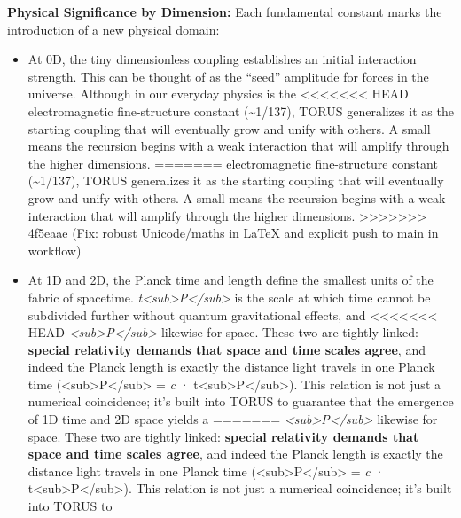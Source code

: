 \documentclass[]{article}
\begin{document}
{\textbf{Physical Significance by Dimension:} Each fundamental constant
marks the introduction of a new physical domain:

\begin{itemize}
\item
  At 0D, the tiny dimensionless coupling \alpha establishes an initial
  interaction strength. This can be thought of as the ``seed'' amplitude
  for forces in the universe. Although \alpha in our everyday physics is the
<<<<<<< HEAD
  electromagnetic fine-structure constant (\textasciitilde1/137), TORUS
  generalizes it as the starting coupling that will eventually grow and
  unify with others. A small \alpha means the recursion begins with a weak
  interaction that will amplify through the higher dimensions.
=======
  electromagnetic fine-structure constant (\textasciitilde{}1/137),
  TORUS generalizes it as the starting coupling that will eventually
  grow and unify with others. A small \alpha means the recursion begins with
  a weak interaction that will amplify through the higher dimensions.
>>>>>>> 4f5eaae (Fix: robust Unicode/maths in LaTeX and explicit push to main in workflow)
\item
  At 1D and 2D, the Planck time and length define the smallest units of
  the fabric of spacetime.
  \emph{t\textless{}sub\textgreater{}P\textless{}/sub\textgreater{}} is
  the scale at which time cannot be subdivided further without quantum
  gravitational effects, and
<<<<<<< HEAD
  \emph{\ell\textless sub\textgreater P\textless/sub\textgreater{}}
  likewise for space. These two are tightly linked: \textbf{special
  relativity demands that space and time scales agree}, and indeed the
  Planck length is exactly the distance light travels in one Planck time
  (\ell\textless sub\textgreater P\textless/sub\textgreater{} = \emph{c} ·
  t\textless sub\textgreater P\textless/sub\textgreater)\hspace{0pt}.
  This relation is not just a numerical coincidence; it's built into
  TORUS to guarantee that the emergence of 1D time and 2D space yields a
=======
  \emph{\ell\textless{}sub\textgreater{}P\textless{}/sub\textgreater{}}
  likewise for space. These two are tightly linked: \textbf{special
  relativity demands that space and time scales agree}, and indeed the
  Planck length is exactly the distance light travels in one Planck time
  (\ell\textless{}sub\textgreater{}P\textless{}/sub\textgreater{} =
  \emph{c} ·
  t\textless{}sub\textgreater{}P\textless{}/sub\textgreater{})​. This
  relation is not just a numerical coincidence; it's built into TORUS to

\end{itemize}}
\end{document}
